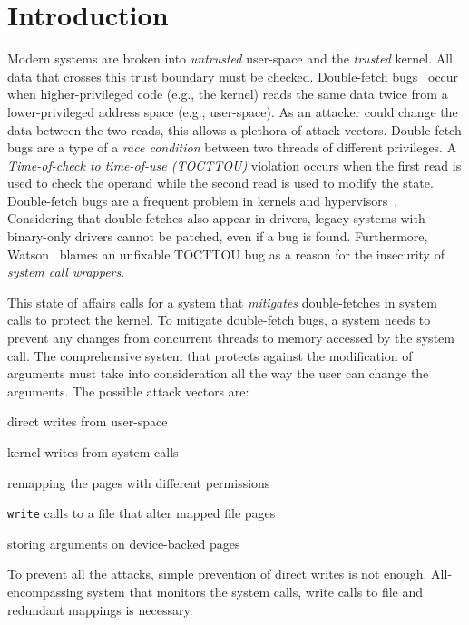 \documentclass[conference]{IEEEtran}
\begin{document}
\section{Introduction}

Modern systems are broken into \emph{untrusted} user-space and the
\emph{trusted} kernel.  All data that crosses this trust boundary must be
checked.  Double-fetch bugs~\cite{serna08doublefetch, twizsgrakky07ring0,
wilhelm2016xenpwn, wang2018survey} occur when higher-privileged code (e.g., the
kernel) reads the same data twice from a lower-privileged address space (e.g.,
user-space). As an attacker could change the data between the two reads, this
allows a plethora of attack vectors.  Double-fetch bugs are a type of a
\emph{race condition} between two threads of different privileges. A
\emph{Time-of-check to time-of-use (TOCTTOU)} violation occurs when the first
read is used to check the operand while the second read is used to modify the
state.  Double-fetch bugs are a frequent problem in kernels and
hypervisors~\cite{cve201812633, cve202012652, cve20131332, cve201920610,
cve20158550, cve201610439, cve201610435, cve201610433, cve20195519,
cve20168438}. Considering that double-fetches also appear in drivers, legacy
systems with binary-only drivers cannot be patched, even if a bug is found.
Furthermore, Watson~\cite{watson2007exploiting} blames an unfixable TOCTTOU bug
as a reason for the insecurity of \emph{system call wrappers}.  

This state of affairs calls for a system that \emph{mitigates} double-fetches in
system calls to protect the kernel.
To mitigate double-fetch bugs, a system needs to prevent any changes from
concurrent threads to memory accessed by the system call.
The comprehensive system that protects against the modification of arguments
must take into consideration all the way the user can change the arguments.
The possible attack vectors are:
\begin{enumerate*}[label=(\roman*)]
\item \label{attk:direct} direct writes from user-space
\item \label{attk:systemcall} kernel writes from system calls
\item \label{attk:remapping} remapping the pages with different permissions
\item \label{attk:writebuffers}\texttt{write} calls to a file that alter mapped file pages
\item \label{attk:devicefiles} storing arguments on device-backed pages
\end{enumerate*}
To prevent all the attacks, simple prevention of direct writes is not enough.
All-encompassing system that monitors the system calls, write calls to file and
redundant mappings is necessary.
\end{document}
